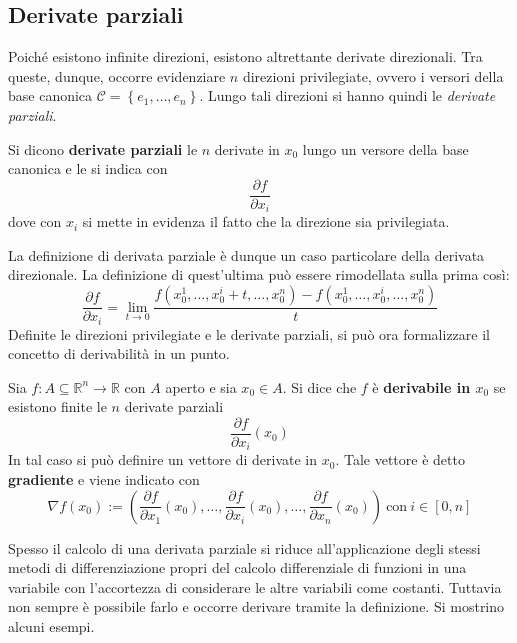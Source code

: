 \subsection{Derivate parziali}
Poiché esistono infinite direzioni, esistono altrettante derivate direzionali. Tra queste, dunque, occorre evidenziare $n$ direzioni privilegiate, ovvero i versori della base canonica $\mathcal{C}=\left\{e_1,\dots, e_n\right\}$. Lungo tali direzioni si hanno quindi le \textit{derivate parziali}.
\begin{definition} \label{Def: Derivate parziali}
    Si dicono \textbf{derivate parziali} le $n$ derivate in $x_0$ lungo un versore della base canonica e le si indica con
    \begin{equation}
        \frac{\partial{f}}{\partial{x_i}}
    \end{equation}
    dove con $x_i$ si mette in evidenza il fatto che la direzione sia privilegiata.
\end{definition}
La definizione di derivata parziale è dunque un caso particolare della derivata direzionale. La definizione di quest'ultima può essere rimodellata sulla prima così:
\begin{equation}
    \frac{\partial{f}}{\partial{x_i}}=\lim_{t \to 0}{\frac{f(x_0^1, \dots, x_0^i+t, \dots, x_0^n)-f(x_0^1, \dots, x_0^i, \dots, x_0^n)}{t}}
\end{equation}
Definite le direzioni privilegiate e le derivate parziali, si può ora formalizzare il concetto di derivabilità in un punto.
\begin{definition} \label{Def: Derivabilità}
    Sia $f:A \subseteq \mathbb{R}^n \to \mathbb{R}$ con $A$ aperto e sia $x_0 \in A$. Si dice che $f$ è \textbf{derivabile in $x_0$} se esistono finite le $n$ derivate parziali
    \begin{equation}
        \frac{\partial{f}}{\partial{x_i}}(x_0)
    \end{equation}
In tal caso si può definire un vettore di derivate in $x_0$. Tale vettore è detto \textbf{gradiente} e viene indicato con
\begin{equation}
    \nabla f(x_0) := \left(\frac{\partial{f}}{\partial{x_1}}(x_0), \dots, \frac{\partial{f}}{\partial{x_i}}(x_0), \dots, \frac{\partial{f}}{\partial{x_n}}(x_0)\right)\ \text{con}\ i \in [0,n]
\end{equation}
\end{definition}
Spesso il calcolo di una derivata parziale si riduce all'applicazione degli stessi metodi di differenziazione propri del calcolo differenziale di funzioni in una variabile con l'accortezza di considerare le altre variabili come costanti. Tuttavia non sempre è possibile farlo e occorre derivare tramite la definizione. Si mostrino alcuni esempi.
